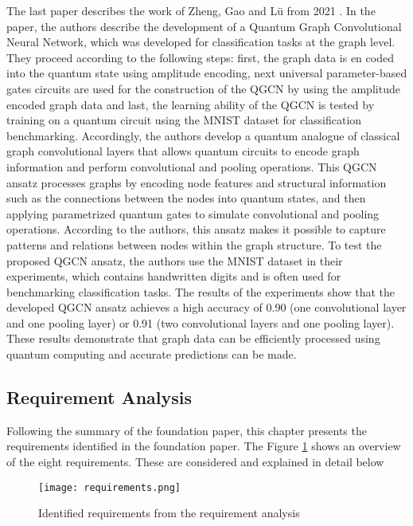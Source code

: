 The last paper describes the work of Zheng, Gao and Lü from 2021 \cite{zheng2021quantum}. In the paper, the authors describe the development of a Quantum Graph Convolutional Neural Network, which was developed for classification tasks at the graph level. They proceed according to the following steps: first, the graph data is en coded into the quantum state using amplitude encoding, next universal parameter-based gates circuits are used for the construction of the QGCN by using the amplitude encoded graph data and last, the learning ability of the QGCN is tested by training on a quantum circuit using the MNIST dataset for classification benchmarking. Accordingly, the authors develop a quantum analogue of classical graph convolutional layers that allows quantum circuits to encode graph information and perform convolutional and pooling operations. This QGCN ansatz processes graphs by encoding node features and structural information such as the connections between the nodes into quantum states, and then applying parametrized quantum gates to simulate convolutional and pooling operations. According to the authors, this ansatz makes it possible to capture patterns and relations between nodes within the graph structure. To test the proposed QGCN ansatz, the authors use the MNIST dataset in their experiments, which contains handwritten digits and is often used for benchmarking classification tasks. The results of the experiments show that the developed QGCN ansatz achieves a high accuracy of 0.90 (one convolutional layer and one pooling layer) or 0.91 (two convolutional layers and one pooling layer). These results demonstrate that graph data can be efficiently processed using quantum computing and accurate predictions can be made.

\subsection{Requirement Analysis}

Following the summary of the foundation paper, this chapter presents the requirements identified in the foundation paper. The Figure \ref{img:requirements} shows an overview of the eight requirements. These are considered and explained in detail below

\begin{figure}[h!]
    \centering
    \texttt{[image: requirements.png]}
    \caption[Identified requirements from the requirement analysis]{\label{img:requirements}{Identified requirements from the requirement analysis}}
    \end{figure} 

